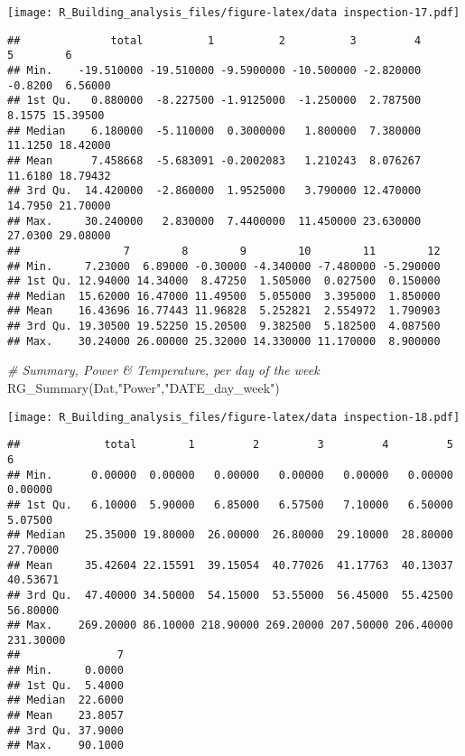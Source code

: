 \documentclass[
]{article}
\newenvironment{Shaded}{\begin{snugshade}}{\end{snugshade}}
\newcommand{\CommentTok}[1]{\textcolor[rgb]{0.56,0.35,0.01}{\textit{#1}}}
\newcommand{\FunctionTok}[1]{\textcolor[rgb]{0.00,0.00,0.00}{#1}}
\newcommand{\NormalTok}[1]{#1}
\newcommand{\StringTok}[1]{\textcolor[rgb]{0.31,0.60,0.02}{#1}}
\begin{document}
\texttt{[image: R\_Building\_analysis\_files/figure-latex/data inspection-17.pdf]}

\begin{verbatim}
##              total          1          2          3         4       5        6
## Min.    -19.510000 -19.510000 -9.5900000 -10.500000 -2.820000 -0.8200  6.56000
## 1st Qu.   0.880000  -8.227500 -1.9125000  -1.250000  2.787500  8.1575 15.39500
## Median    6.180000  -5.110000  0.3000000   1.800000  7.380000 11.1250 18.42000
## Mean      7.458668  -5.683091 -0.2002083   1.210243  8.076267 11.6180 18.79432
## 3rd Qu.  14.420000  -2.860000  1.9525000   3.790000 12.470000 14.7950 21.70000
## Max.     30.240000   2.830000  7.4400000  11.450000 23.630000 27.0300 29.08000
##                7        8        9        10        11        12
## Min.     7.23000  6.89000 -0.30000 -4.340000 -7.480000 -5.290000
## 1st Qu. 12.94000 14.34000  8.47250  1.505000  0.027500  0.150000
## Median  15.62000 16.47000 11.49500  5.055000  3.395000  1.850000
## Mean    16.43696 16.77443 11.96828  5.252821  2.554972  1.790903
## 3rd Qu. 19.30500 19.52250 15.20500  9.382500  5.182500  4.087500
## Max.    30.24000 26.00000 25.32000 14.330000 11.170000  8.900000
\end{verbatim}

\begin{Shaded}
\begin{Highlighting}[]
  \CommentTok{\# Summary, Power \& Temperature, per day of the week }
  \FunctionTok{RG\_Summary}\NormalTok{(Dat,}\StringTok{"Power"}\NormalTok{,}\StringTok{"DATE\_day\_week"}\NormalTok{)}
\end{Highlighting}
\end{Shaded}

\texttt{[image: R\_Building\_analysis\_files/figure-latex/data inspection-18.pdf]}

\begin{verbatim}
##             total        1         2         3         4         5         6
## Min.      0.00000  0.00000   0.00000   0.00000   0.00000   0.00000   0.00000
## 1st Qu.   6.10000  5.90000   6.85000   6.57500   7.10000   6.50000   5.07500
## Median   25.35000 19.80000  26.00000  26.80000  29.10000  28.80000  27.70000
## Mean     35.42604 22.15591  39.15054  40.77026  41.17763  40.13037  40.53671
## 3rd Qu.  47.40000 34.50000  54.15000  53.55000  56.45000  55.42500  56.80000
## Max.    269.20000 86.10000 218.90000 269.20000 207.50000 206.40000 231.30000
##               7
## Min.     0.0000
## 1st Qu.  5.4000
## Median  22.6000
## Mean    23.8057
## 3rd Qu. 37.9000
## Max.    90.1000
\end{verbatim}
\end{document}

